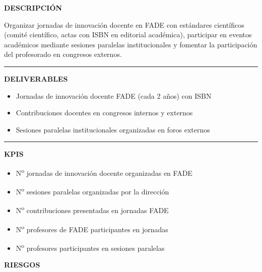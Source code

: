 \documentclass[11pt,a4paper]{scrreprt}
\newcommand{\fieldlabel}[1]{%
  {\footnotesize\sffamily\bfseries\color{mutedcolor}\MakeUppercase{#1}}\par\nopagebreak[4]
}
\newcommand{\fieldsep}{\vspace{3pt}\noindent\textcolor{bordercolor}{\rule{\linewidth}{0.4pt}}\vspace{3pt}\par}
\begin{document}
\begin{tcolorbox}[pabox={aacolor}{PA4.2 \enspace\textbullet\enspace Impulso y difusión de la innovación docente de FADE}]

\fieldlabel{Descripci\'on}
{\small Organizar jornadas de innovación docente en FADE con estándares científicos (comité científico, actas con ISBN en editorial académica), participar en eventos académicos mediante sesiones paralelas institucionales y fomentar la participación del profesorado en congresos externos.}\par
\fieldsep
\fieldlabel{Deliverables}
{\small \begin{itemize}[noitemsep,topsep=2pt]
\item Jornadas de innovación docente FADE (cada 2 años) con ISBN
\item Contribuciones docentes en congresos internos y externos
\item Sesiones paralelas institucionales organizadas en foros externos
\end{itemize}}\par
\fieldsep
\fieldlabel{KPIs}
{\small \begin{itemize}[noitemsep,topsep=2pt]
\item N\textsuperscript{o} jornadas de innovación docente organizadas en FADE
\item N\textsuperscript{o} sesiones paralelas organizadas por la dirección
\item N\textsuperscript{o} contribuciones presentadas en jornadas FADE
\item N\textsuperscript{o} profesores de FADE participantes en jornadas
\item N\textsuperscript{o} profesores participantes en sesiones paralelas
\end{itemize}}\par
\end{tcolorbox}
\begin{tcolorbox}[riskbox]
{\footnotesize\sffamily\bfseries\color{red!50!black} RIESGOS}\par{}
\end{tcolorbox}
\end{document}
